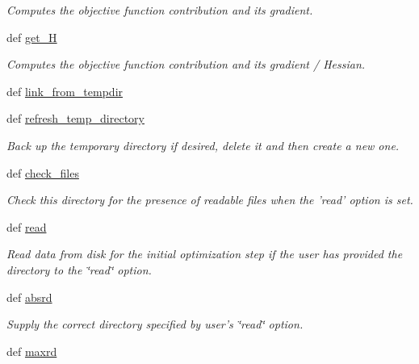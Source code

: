 \begin{DoxyCompactItemize}
\begin{DoxyCompactList}\small\item\em Computes the objective function contribution and its gradient. \end{DoxyCompactList}\item 
def \hyperlink{classforcebalance_1_1target_1_1Target_a1d2ee27fe86a09769c1816af23b09adb}{get\-\_\-\-H}
\begin{DoxyCompactList}\small\item\em Computes the objective function contribution and its gradient / Hessian. \end{DoxyCompactList}\item 
def \hyperlink{classforcebalance_1_1target_1_1Target_a5aa4958cea0a48138511567a076c5a82}{link\-\_\-from\-\_\-tempdir}
\item 
def \hyperlink{classforcebalance_1_1target_1_1Target_afe815eafab06ac92f10bbf4b88ad95c8}{refresh\-\_\-temp\-\_\-directory}
\begin{DoxyCompactList}\small\item\em Back up the temporary directory if desired, delete it and then create a new one. \end{DoxyCompactList}\item 
def \hyperlink{classforcebalance_1_1target_1_1Target_ac790529c5f85f0547fe3601ad1cf2419}{check\-\_\-files}
\begin{DoxyCompactList}\small\item\em Check this directory for the presence of readable files when the 'read' option is set. \end{DoxyCompactList}\item 
def \hyperlink{classforcebalance_1_1target_1_1Target_afb87b4d33b88bb381c74b76752c5892a}{read}
\begin{DoxyCompactList}\small\item\em Read data from disk for the initial optimization step if the user has provided the directory to the \char`\"{}read\char`\"{} option. \end{DoxyCompactList}\item 
def \hyperlink{classforcebalance_1_1target_1_1Target_abb0a6089d8deaead8f78186cc8e4cbe4}{absrd}
\begin{DoxyCompactList}\small\item\em Supply the correct directory specified by user's \char`\"{}read\char`\"{} option. \end{DoxyCompactList}\item 
def \hyperlink{classforcebalance_1_1target_1_1Target_a961ce7e772836b1465cb44e3f03145df}{maxrd}

\end{DoxyCompactItemize}

